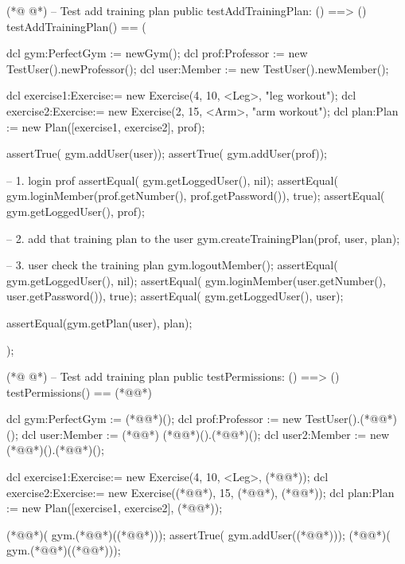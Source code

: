 \begin{vdmpp}[breaklines=true]
(*@
\label{testAddTrainingPlan:400}
@*)
 -- Test add training plan
 public testAddTrainingPlan: () ==> ()
 testAddTrainingPlan() == (
  
  dcl gym:PerfectGym := newGym();
  dcl prof:Professor := new TestUser().newProfessor();  
  dcl user:Member := new TestUser().newMember(); 
 
  dcl exercise1:Exercise:= new Exercise(4, 10, <Leg>, "leg workout");
  dcl exercise2:Exercise:= new Exercise(2, 15, <Arm>, "arm workout");
  dcl plan:Plan := new Plan([exercise1, exercise2], prof);
  
  assertTrue( gym.addUser(user));
  assertTrue( gym.addUser(prof));
  
  -- 1. login prof
  assertEqual( gym.getLoggedUser(), nil); 
  assertEqual( gym.loginMember(prof.getNumber(), prof.getPassword()), true);
  assertEqual( gym.getLoggedUser(), prof);
  
  -- 2. add that training plan to the user
  gym.createTrainingPlan(prof, user, plan);
  
  -- 3. user check the training plan
   gym.logoutMember();
   assertEqual( gym.getLoggedUser(), nil); 
   assertEqual( gym.loginMember(user.getNumber(), user.getPassword()), true);
   assertEqual( gym.getLoggedUser(), user);
   
   assertEqual(gym.getPlan(user), plan);
  
 );
 
(*@
\label{testPermissions:433}
@*)
 -- Test add training plan
 public testPermissions: () ==> ()
 testPermissions() == (*@\vdmnotcovered{(}@*)
  
  dcl gym:PerfectGym := (*@@*)();
  dcl prof:Professor := new TestUser().(*@@*)();  
  dcl user:Member := (*@@*) (*@@*)().(*@@*)(); 
   dcl user2:Member := new (*@@*)().(*@@*)(); 
   
  dcl exercise1:Exercise:= new Exercise(4, 10, <Leg>, (*@@*));
  dcl exercise2:Exercise:= new Exercise((*@@*), 15, (*@@*), (*@@*));
  dcl plan:Plan := new Plan([exercise1, exercise2], (*@@*));
  
  (*@@*)( gym.(*@@*)((*@@*)));
  assertTrue( gym.addUser((*@@*)));
  (*@@*)( gym.(*@@*)((*@@*)));
  

\end{vdmpp}
